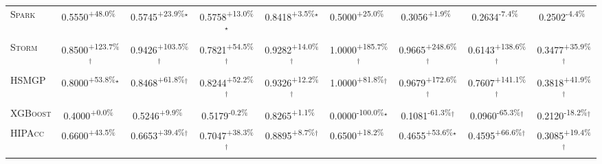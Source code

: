 \begin{table}[htbp]
\begin{tabular}{l|cccc|cccc}
\textsc{Spark} & \cellcolor{green!30}0.5550\textsuperscript{+48.0\%}$^{\,\,\,}$ & \cellcolor{green!30}0.5745\textsuperscript{+23.9\%}$^\star$ & \cellcolor{green!30}0.5758\textsuperscript{+13.0\%}$^\star$ & \cellcolor{green!30}0.8418\textsuperscript{+3.5\%}$^\star$ & \cellcolor{green!30}0.5000\textsuperscript{+25.0\%}$^{\,\,\,}$ & \cellcolor{green!30}0.3056\textsuperscript{+1.9\%}$^{\,\,\,}$ & \cellcolor{red!30}0.2634\textsuperscript{-7.4\%}$^{\,\,\,}$ & \cellcolor{red!30}0.2502\textsuperscript{-4.4\%}$^{\,\,\,}$ \\
\textsc{Storm} & \cellcolor{green!30}0.8500\textsuperscript{+123.7\%}$^\dagger$ & \cellcolor{green!30}0.9426\textsuperscript{+103.5\%}$^\dagger$ & \cellcolor{green!30}0.7821\textsuperscript{+54.5\%}$^\dagger$ & \cellcolor{green!30}0.9282\textsuperscript{+14.0\%}$^\dagger$ & \cellcolor{green!30}1.0000\textsuperscript{+185.7\%}$^\dagger$ & \cellcolor{green!30}0.9665\textsuperscript{+248.6\%}$^\dagger$ & \cellcolor{green!30}0.6143\textsuperscript{+138.6\%}$^\dagger$ & \cellcolor{green!30}0.3477\textsuperscript{+35.9\%}$^\dagger$ \\
\textsc{HSMGP} & \cellcolor{green!30}0.8000\textsuperscript{+53.8\%}$^\star$ & \cellcolor{green!30}0.8468\textsuperscript{+61.8\%}$^\dagger$ & \cellcolor{green!30}0.8244\textsuperscript{+52.2\%}$^\dagger$ & \cellcolor{green!30}0.9326\textsuperscript{+12.2\%}$^\dagger$ & \cellcolor{green!30}1.0000\textsuperscript{+81.8\%}$^\dagger$ & \cellcolor{green!30}0.9679\textsuperscript{+172.6\%}$^\dagger$ & \cellcolor{green!30}0.7607\textsuperscript{+141.1\%}$^\dagger$ & \cellcolor{green!30}0.3818\textsuperscript{+41.9\%}$^\dagger$ \\
\textsc{XGBoost} & \cellcolor{green!30}0.4000\textsuperscript{+0.0\%}$^{\,\,\,}$ & \cellcolor{green!30}0.5246\textsuperscript{+9.9\%}$^{\,\,\,}$ & \cellcolor{red!30}0.5179\textsuperscript{-0.2\%}$^{\,\,\,}$ & \cellcolor{green!30}0.8265\textsuperscript{+1.1\%}$^{\,\,\,}$ & \cellcolor{red!30}0.0000\textsuperscript{-100.0\%}$^\star$ & \cellcolor{red!30}0.1081\textsuperscript{-61.3\%}$^\dagger$ & \cellcolor{red!30}0.0960\textsuperscript{-65.3\%}$^\dagger$ & \cellcolor{red!30}0.2120\textsuperscript{-18.2\%}$^\dagger$ \\
\textsc{HIPAcc} & \cellcolor{green!30}0.6600\textsuperscript{+43.5\%}$^{\,\,\,}$ & \cellcolor{green!30}0.6653\textsuperscript{+39.4\%}$^\dagger$ & \cellcolor{green!30}0.7047\textsuperscript{+38.3\%}$^\dagger$ & \cellcolor{green!30}0.8895\textsuperscript{+8.7\%}$^\dagger$ & \cellcolor{green!30}0.6500\textsuperscript{+18.2\%}$^{\,\,\,}$ & \cellcolor{green!30}0.4655\textsuperscript{+53.6\%}$^\star$ & \cellcolor{green!30}0.4595\textsuperscript{+66.6\%}$^\dagger$ & \cellcolor{green!30}0.3085\textsuperscript{+19.4\%}$^\dagger$ \\

\end{tabular}
\end{table}
